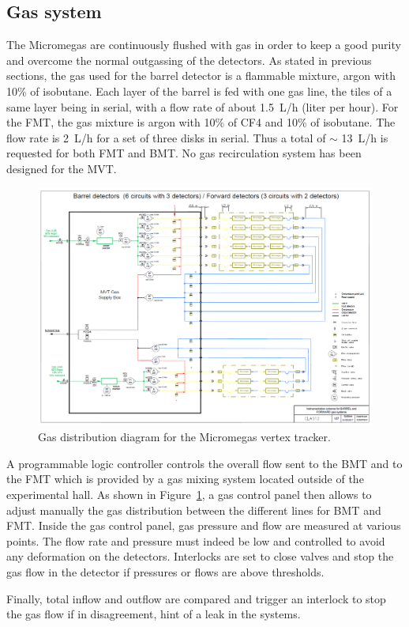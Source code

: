 \subsection{Gas system}
The Micromegas are continuously flushed with gas in order to keep a good purity and overcome the normal outgassing of the detectors. As stated in previous sections, the gas used for the barrel detector is a flammable mixture, argon with 10\% of isobutane. Each layer of the barrel is fed with one gas line, the tiles of a same layer being in serial, with a flow rate of about 1.5~L/h (liter per hour). For the FMT, the gas mixture is argon with 10\% of CF4 and 10\% of isobutane. The flow rate is 2~L/h for a set of three disks in serial. Thus a total of $\sim$ 13~L/h is requested for both FMT and BMT. No gas recirculation system has been designed for the MVT. 

\begin{figure}[htb]
\includegraphics[width=2\columnwidth,keepaspectratio]{images/gas_system}
 \caption{Gas distribution diagram for the Micromegas vertex tracker.}
 \label{fig:mm-gas-sys}
\end{figure}

A programmable logic controller controls the overall flow sent to the BMT and to the FMT which is provided by a gas mixing system located outside of the experimental hall. As shown in Figure~\ref{fig:mm-gas-sys}, a gas control panel then allows to adjust manually the gas distribution between the different lines for BMT and FMT. Inside the gas control panel, gas pressure and flow are measured at various points. The flow rate and pressure must indeed be low and controlled to avoid any deformation on the detectors. Interlocks are set to close valves and stop the gas flow in the detector if pressures or flows are above thresholds. 

Finally, total inflow and outflow are compared and trigger an interlock to stop the gas flow if in disagreement, hint of a leak in the systems. 

 